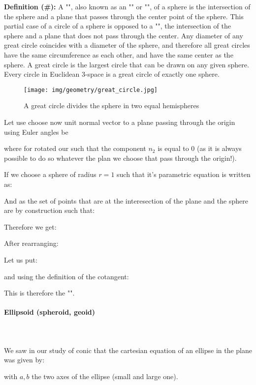 {	\textbf{Definition (\#\mydef):}  A "", also known as an "" or "", of a sphere is the intersection of the sphere and a plane that passes through the center point of the sphere. This partial case of a circle of a sphere is opposed to a "", the intersection of the sphere and a plane that does not pass through the center. Any diameter of any great circle coincides with a diameter of the sphere, and therefore all great circles have the same circumference as each other, and have the same center as the sphere. A great circle is the largest circle that can be drawn on any given sphere. Every circle in Euclidean 3-space is a great circle of exactly one sphere.
	\begin{figure}[H]
		\centering
		\texttt{[image: img/geometry/great\_circle.jpg]}
		\caption{A great circle divides the sphere in two equal hemispheres}
	\end{figure}
	Let use choose now unit normal vector to a plane passing through the origin using Euler angles be
	
	where for rotated our such that the component $n_2$ is equal to $0$ (as it is always possible to do so whatever the plan we choose that pass through the origin!).
	
	If we choose a sphere of radius $r=1$ such that it's parametric equation is written as:
	
	And as the set of points that are at the interesection of the plane and the sphere are by construction such that:
	
	Therefore we get:
	
	After rearranging:
	
	Let us put:
	
	and using the definition of the cotangent:
	
	This is therefore the "".
	
	\pagebreak
	\paragraph{Ellipsoid (spheroid, geoid)}\mbox{}\\\\
	We saw in our study of conic that the cartesian equation of an ellipse in the plane was given by:
	
	with $a, b$ the two axes of the ellipse (small and large one).
	
}
